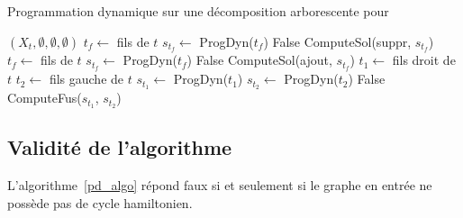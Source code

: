 \begin{algorithm}
    \caption{Programmation dynamique sur une décomposition arborescente pour \hcycle}
    \label{pd_algo}
    \begin{algorithmic}[1]
                \State \Return $(X_t, \emptyset, \emptyset, \emptyset)$
            \EndIf
                \State $t_f \gets$ fils de $t$
                \State $s_{t_f} \gets$ ProgDyn($t_f$)
                    \State \Return False
                \EndIf
                \State \Return ComputeSol(suppr, $s_{t_f}$)
            \EndIf
                \State $t_f \gets$ fils de $t$
                \State $s_{t_f} \gets$ ProgDyn($t_f$)
                    \State \Return False
                \EndIf
                \State \Return ComputeSol(ajout, $s_{t_f}$)
            \EndIf
                \State $t_1 \gets$ fils droit de $t$
                \State $t_2 \gets$ fils gauche de $t$
                \State $s_{t_1} \gets$ ProgDyn($t_1$)
                \State $s_{t_2} \gets$ ProgDyn($t_2$)
                    \State \Return False
                \EndIf
                \State \Return ComputeFus($s_{t_1}$, $s_{t_2}$)
            \EndIf
        \EndFunction
    \end{algorithmic}
\end{algorithm}

\subsection{Validité de l'algorithme}

\begin{nthrm}
    L'algorithme~\ref{pd_algo} répond faux si et seulement si le graphe en entrée ne possède pas de cycle
    hamiltonien.
\end{nthrm}

